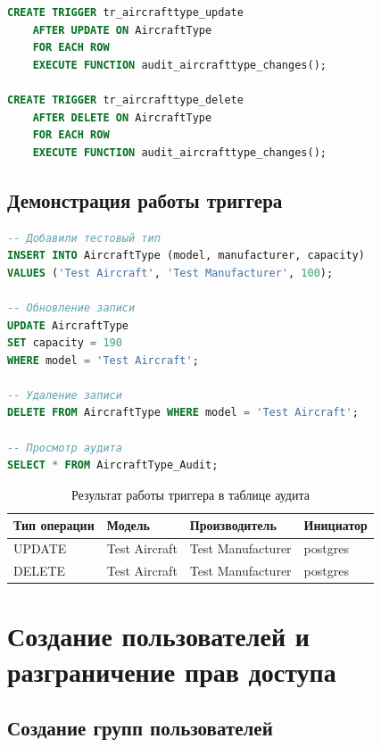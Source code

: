 \documentclass[a4paper,12pt]{article}
\begin{document}
\begin{lstlisting}[language=SQL, caption=Создание триггеров]
CREATE TRIGGER tr_aircrafttype_update
    AFTER UPDATE ON AircraftType
    FOR EACH ROW
    EXECUTE FUNCTION audit_aircrafttype_changes();

CREATE TRIGGER tr_aircrafttype_delete
    AFTER DELETE ON AircraftType
    FOR EACH ROW
    EXECUTE FUNCTION audit_aircrafttype_changes();
\end{lstlisting}

\subsection{Демонстрация работы триггера}

\begin{lstlisting}[language=SQL, caption=Проверка работы триггера]
-- Добавили тестовый тип
INSERT INTO AircraftType (model, manufacturer, capacity) 
VALUES ('Test Aircraft', 'Test Manufacturer', 100);

-- Обновление записи
UPDATE AircraftType 
SET capacity = 190 
WHERE model = 'Test Aircraft';

-- Удаление записи
DELETE FROM AircraftType WHERE model = 'Test Aircraft';

-- Просмотр аудита
SELECT * FROM AircraftType_Audit;
\end{lstlisting}

\begin{table}[H]
\centering
\caption{Результат работы триггера в таблице аудита}
\begin{tabular}{|p{2cm}|p{3cm}|p{3cm}|p{3cm}|}
\hline
\textbf{Тип операции} & \textbf{Модель} & \textbf{Производитель} & \textbf{Инициатор} \\
\hline
UPDATE & Test Aircraft & Test Manufacturer & postgres \\
\hline
DELETE & Test Aircraft & Test Manufacturer & postgres \\
\hline
\end{tabular}
\end{table}

\section{Создание пользователей и разграничение прав доступа}

\subsection{Создание групп пользователей}
\end{document}
